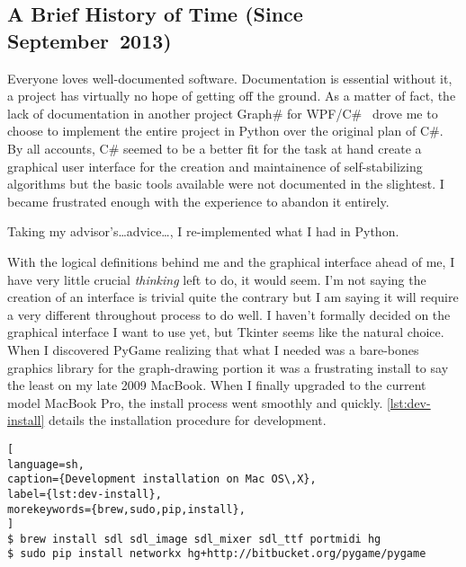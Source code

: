\subsection{A Brief History of Time (Since September~2013)}
Everyone loves well-documented software.
Documentation is essential \Dash without it, a project has virtually no hope of getting off the ground.
As a matter of fact, the lack of documentation in another project \Dash
  Graph\# for WPF/C\#~\autocite{palesz:graphsharp} \Dash
  drove me to choose to implement the entire project in Python over the original plan of C\#.
By all accounts, C\# seemed to be a better fit for the task at hand \Dash
  create a graphical user interface for the creation and maintainence of self-stabilizing algorithms \Dash
  but the basic tools available were not documented in the slightest.
I became frustrated enough with the experience to abandon it entirely.

Taking my advisor's\dots advice\dots, I re-implemented what I had in Python.
%

\bigskip

With the logical definitions behind me and the graphical interface ahead of me,
  I have very little crucial \emph{thinking} left to do, it would seem.
I'm not saying the creation of an interface is trivial \Dash quite the contrary \Dash
  but I am saying it will require a very different throughout process to do well.
I haven't formally decided on the graphical interface I want to use yet, but Tkinter seems like the natural choice.
%
When I discovered PyGame \Dash realizing that what I needed was
  a bare-bones graphics library for the graph-drawing portion \Dash
  it was a frustrating install to say the least on my late 2009 MacBook.
%
When I finally upgraded to the current model MacBook Pro,
  the install process went smoothly and quickly.
\autoref{lst:dev-install} details the installation procedure for development.

\begin{lstlisting}[
language=sh,
caption={Development installation on Mac OS\,X},
label={lst:dev-install},
morekeywords={brew,sudo,pip,install},
]
$ brew install sdl sdl_image sdl_mixer sdl_ttf portmidi hg
$ sudo pip install networkx hg+http://bitbucket.org/pygame/pygame
\end{lstlisting}

